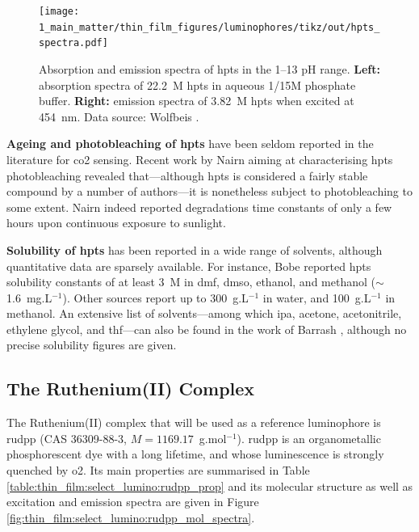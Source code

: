 \begin{figure}
	\centering
	\texttt{[image: 1\_main\_matter/thin\_film\_figures/luminophores/tikz/out/hpts\_spectra.pdf]}
	\caption[Absorption and emission spectra of \gls{hpts} in the 1--13 pH range.]{Absorption and emission spectra of \gls{hpts} in the 1--13 pH range. \textbf{Left:} absorption spectra of 22.2~\textmu{}M \gls{hpts} in aqueous 1/15M phosphate buffer. \textbf{Right:} emission spectra of 3.82~\textmu{}M \gls{hpts} when excited at 454~nm. Data source: Wolfbeis \etal{}\cite{wolfbeis1983}.}
	\label{fig:thin_film:select_lumino:hpts_spectra}
\end{figure}

\textbf{Ageing and photobleaching of \gls{hpts}} have been seldom reported in the literature for \gls{co2} sensing\cite{borisov2007}. Recent work by Nairn \etal{}\cite{nairn2015} aiming at characterising \gls{hpts} photobleaching revealed that---although \gls{hpts} is considered a fairly stable compound by a number of authors\cite{wolfbeis1998, bultzingslowen2002, cajlakovic2006}---it is nonetheless subject to photobleaching to some extent. Nairn \etal{} indeed reported degradations time constants of only a few hours upon continuous exposure to sunlight.

\textbf{Solubility of \gls{hpts}} has been reported in a wide range of solvents, although quantitative data are sparsely available. For instance, Bobe \etal{} reported \gls{hpts} solubility constants of at least 3~{\textmu}M in \gls{dmf}, \gls{dmso}, ethanol, and methanol\cite{bobe2014} ($\sim$1.6~mg.L$^{-1}$). Other sources report up to 300~g.L$^{-1}$ in water, and 100~g.L$^{-1}$ in methanol\cite{chembookpyranine}. An extensive list of solvents---among which \gls{ipa}, acetone, acetonitrile, ethylene glycol, and \gls{thf}---can also be found in the work of Barrash \etal{}\cite{barrash1998}, although no precise solubility figures are given.

\subsection{The Ruthenium(II) Complex}\label{subsect:thin_film:select_lumino:rudpp}

The Ruthenium(II) complex that will be used as a reference luminophore is \gls{rudpp} (CAS 36309-88-3, $M=1169.17$~g.mol$^{-1}$). \gls{rudpp} is an organometallic phosphorescent dye with a long lifetime, and whose luminescence is strongly quenched by \gls{o2}. Its main properties are summarised in Table \ref{table:thin_film:select_lumino:rudpp_prop} and its molecular structure as well as excitation and emission spectra are given in Figure \ref{fig:thin_film:select_lumino:rudpp_mol_spectra}.

